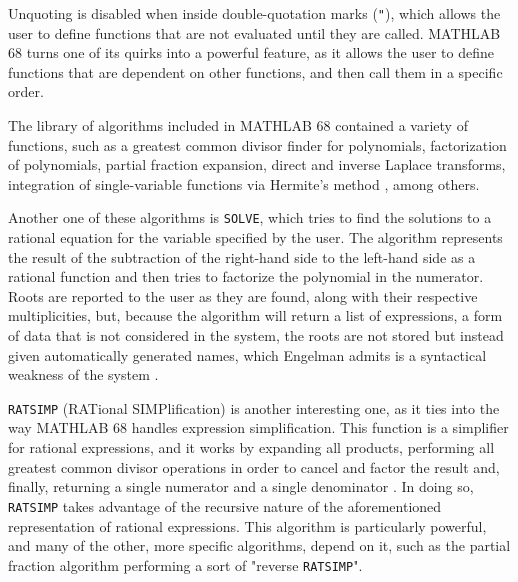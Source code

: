 Unquoting is disabled when inside double-quotation marks (\verb|"|), which allows the user to define functions that are not evaluated until they are called. MATHLAB 68 turns one of its quirks into a powerful feature, as it allows the user to define functions that are dependent on other functions, and then call them in a specific order.

The library of algorithms included in MATHLAB 68 contained a variety of functions, such as a greatest common divisor finder for polynomials, factorization of polynomials,  partial fraction expansion, direct and inverse Laplace transforms, integration of single-variable functions via Hermite's method \parencite{hardy1916integration}, among others.

Another one of these algorithms is \verb|SOLVE|, which tries to find the solutions to a rational equation for the variable specified by the user. The algorithm represents the result of the subtraction of the right-hand side to the left-hand side as a rational function and then tries to factorize the polynomial in the numerator. Roots are reported to the user as they are found, along with their respective multiplicities, but, because the algorithm will return a list of expressions, a form of data that is not considered in the system, the roots are not stored but instead given automatically generated names, which Engelman admits is a syntactical weakness of the system \parencite*{engelman1971legacy}.

\verb|RATSIMP| (RATional SIMPlification) is another interesting one, as it ties into the way MATHLAB 68 handles expression simplification. This function is a simplifier for rational expressions, and it works by expanding all products, performing all greatest common divisor operations in order to cancel and factor the result and, finally, returning a single numerator and a single denominator \parencite{engelman1971legacy}. In doing so, \verb|RATSIMP| takes advantage of the recursive nature of the aforementioned representation of rational expressions. This algorithm is particularly powerful, and many of the other, more specific algorithms, depend on it, such as the partial fraction algorithm performing a sort of "reverse \verb|RATSIMP|".

